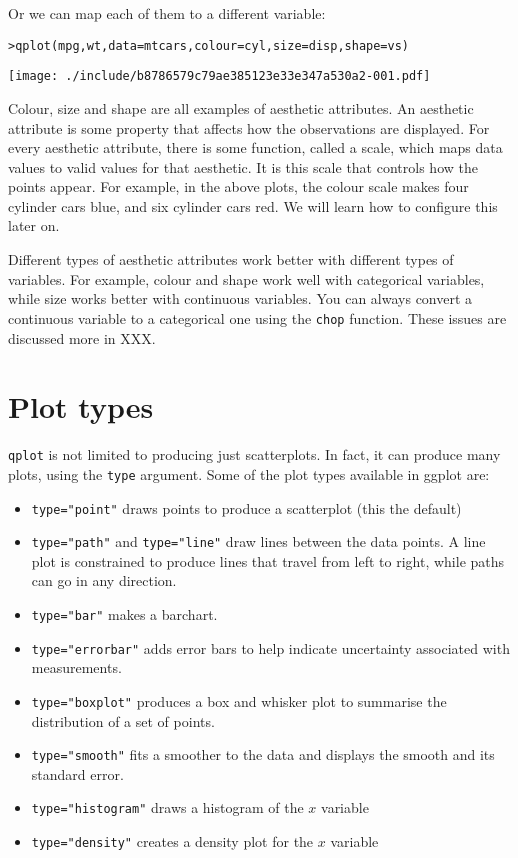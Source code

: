 Or we can map each of them to a different variable:

\begin{alltt}
> qplot(mpg, wt, data = mtcars, colour = cyl, size = disp, shape = vs)
\end{alltt}
\texttt{[image: ./include/b8786579c79ae385123e33e347a530a2-001.pdf]}
\begin{alltt}

\end{alltt}

Colour, size and shape are all examples of aesthetic attributes.  An aesthetic attribute is some property that affects how the observations are displayed.  For every aesthetic attribute, there is some function, called a scale, which maps data values to valid values for that aesthetic.  It is this scale that controls how the points appear.  For example, in the above plots, the colour scale makes four cylinder cars blue, and six cylinder cars red.  We will learn how to configure this later on.

Different types of aesthetic attributes work better with different types of variables.  For example, colour and shape work well with categorical variables, while size works better with continuous variables.  You can always convert a continuous variable to a categorical one using the {\tt chop} function.  These issues are discussed more in XXX.

\section{Plot types}\label{sec:plot_types}

{\tt qplot} is not limited to producing just scatterplots.  In fact, it can produce many plots, using the {\tt type} argument.  Some of the plot types available in ggplot are:

\begin{itemize}
	\item {\tt type="point"} draws points to produce a scatterplot (this the default)
	\item {\tt type="path"} and {\tt type="line"} draw lines between the data points.  A line plot is constrained to produce lines that travel from left to right, while paths can go in any direction.
	\item {\tt type="bar"} makes a barchart.
	\item {\tt type="errorbar"} adds error bars to help indicate uncertainty associated with measurements.
	\item {\tt type="boxplot"} produces a box and whisker plot to summarise the distribution of a set of points.
	\item {\tt type="smooth"} fits a smoother to the data and displays the smooth and its standard error.
	\item {\tt type="histogram"} draws a histogram of the $x$ variable
	\item {\tt type="density"} creates a density plot for the $x$ variable
\end{itemize}

